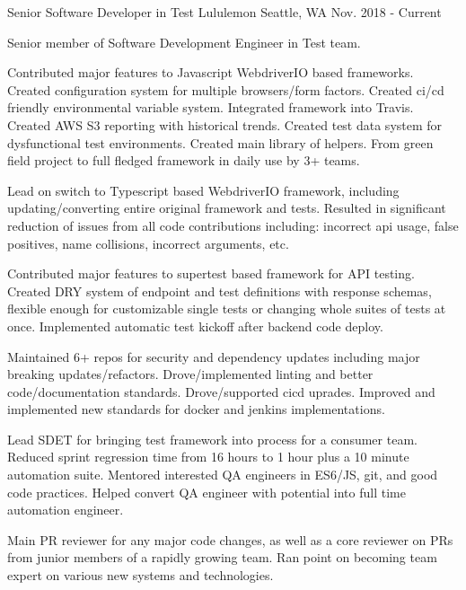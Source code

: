 

\begin{cventries}

  \cventry
    {Senior Software Developer in Test} %
    {Lululemon} %
    {Seattle, WA} %
    {Nov. 2018 - Current} %
    {
      \begin{cvitems} %
        \item[] {Senior member of Software Development Engineer in Test team.}
        \item[]
        \item {Contributed major features to Javascript WebdriverIO based frameworks. Created configuration system for multiple browsers/form factors. Created ci/cd friendly environmental variable system. Integrated framework into Travis. Created AWS S3 reporting with historical trends. Created test data system for dysfunctional test environments. Created main library of helpers. From green field project to full fledged framework in daily use by 3+ teams.}
        \item {Lead on switch to Typescript based WebdriverIO framework, including updating/converting entire original framework and tests. Resulted in significant reduction of issues from all code contributions including: incorrect api usage, false positives, name collisions, incorrect arguments, etc.}
        \item {Contributed major features to supertest based framework for API testing. Created DRY system of endpoint and test definitions with response schemas, flexible enough for customizable single tests or changing whole suites of tests at once. Implemented automatic test kickoff after backend code deploy.}
        \item {Maintained 6+ repos for security and dependency updates including major breaking updates/refactors. Drove/implemented linting and better code/documentation standards. Drove/supported cicd uprades. Improved and implemented new standards for docker and jenkins implementations.}
        \item {Lead SDET for bringing test framework into process for a consumer team. Reduced sprint regression time from 16 hours to 1 hour plus a 10 minute automation suite. Mentored interested QA engineers in ES6/JS, git, and good code practices. Helped convert QA engineer with potential into full time automation engineer.}
        \item {Main PR reviewer for any major code changes, as well as a core reviewer on PRs from junior members of a rapidly growing team. Ran point on becoming team expert on various new systems and technologies.}
      \end{cvitems}
    }


\end{cventries}
